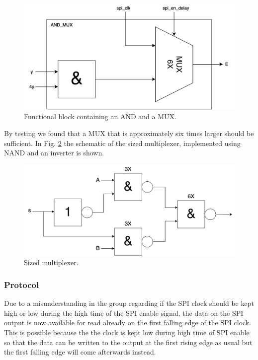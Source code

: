 \begin{figure}[H]
\centering
\captionsetup{justification=centering}
\includegraphics[scale=0.2]{../figures/AND_MUX.png}
\caption{Functional block containing an AND and a MUX.}
\label{and_mux}
\end{figure}

\raggedright By testing we found that a MUX that is approximately six times larger should be sufficient. In Fig. \ref{mux6x} the schematic of the sized multiplexer, implemented using NAND and an inverter is shown.

\begin{figure}[H]
\centering
\captionsetup{justification=centering}
\includegraphics[scale=0.2]{../figures/MUX6X.png}
\caption{Sized multiplexer.}
\label{mux6x}
\end{figure}

\subsubsection{Protocol}
Due to a misunderstanding in the group regarding if the SPI clock should be kept high or low during the high time of the SPI enable signal, the data on the SPI output is now available for read already on the first falling edge of the SPI clock. This is possible because the the clock is kept low during high time of SPI enable so that the data can be written to the output at the first rising edge as usual but the first falling edge will come afterwards instead.



